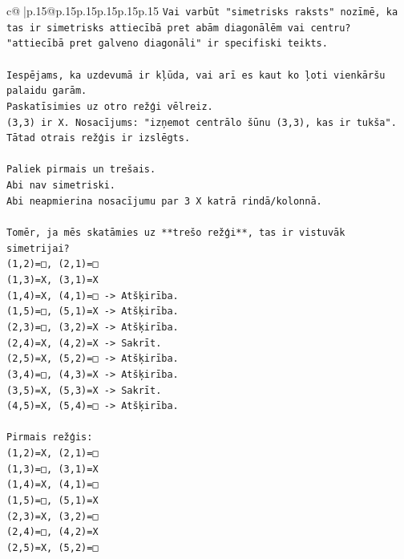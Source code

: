 \documentclass{article}
\begin{document}
{\begin{supertabular}{c@{$\;$}|p{.15\linewidth}@{}p{.15\linewidth}p{.15\linewidth}p{.15\linewidth}p{.15\linewidth}p{.15\linewidth}}
{{{\texttt{Vai varbūt "simetrisks raksts" nozīmē, ka tas ir simetrisks attiecībā pret abām diagonālēm vai centru?} \\
\texttt{"attiecībā pret galveno diagonāli" ir specifiski teikts.} \\
\\ 
\texttt{Iespējams, ka uzdevumā ir kļūda, vai arī es kaut ko ļoti vienkāršu palaidu garām.} \\
\texttt{Paskatīsimies uz otro režģi vēlreiz.} \\
\texttt{(3,3) ir X. Nosacījums: "izņemot centrālo šūnu (3,3), kas ir tukša".} \\
\texttt{Tātad otrais režģis ir izslēgts.} \\
\\ 
\texttt{Paliek pirmais un trešais.} \\
\texttt{Abi nav simetriski.} \\
\texttt{Abi neapmierina nosacījumu par 3 X katrā rindā/kolonnā.} \\
\\ 
\texttt{Tomēr, ja mēs skatāmies uz **trešo režģi**, tas ir vistuvāk simetrijai?} \\
\texttt{(1,2)=□, (2,1)=□} \\
\texttt{(1,3)=X, (3,1)=X} \\
\texttt{(1,4)=X, (4,1)=□ {-}> Atšķirība.} \\
\texttt{(1,5)=□, (5,1)=X {-}> Atšķirība.} \\
\texttt{(2,3)=□, (3,2)=X {-}> Atšķirība.} \\
\texttt{(2,4)=X, (4,2)=X {-}> Sakrīt.} \\
\texttt{(2,5)=X, (5,2)=□ {-}> Atšķirība.} \\
\texttt{(3,4)=□, (4,3)=X {-}> Atšķirība.} \\
\texttt{(3,5)=X, (5,3)=X {-}> Sakrīt.} \\
\texttt{(4,5)=X, (5,4)=□ {-}> Atšķirība.} \\
\\ 
\texttt{Pirmais režģis:} \\
\texttt{(1,2)=X, (2,1)=□} \\
\texttt{(1,3)=□, (3,1)=X} \\
\texttt{(1,4)=X, (4,1)=□} \\
\texttt{(1,5)=□, (5,1)=X} \\
\texttt{(2,3)=X, (3,2)=□} \\
\texttt{(2,4)=□, (4,2)=X} \\
\texttt{(2,5)=X, (5,2)=□} \\
}}}
\end{supertabular}}
\end{document}
